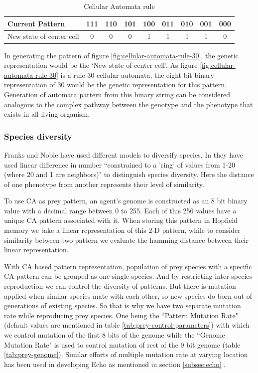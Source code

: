 \documentclass[letterpaper]{article}
\numberwithin{equation}{section}
\begin{document}
\begin{table}[H]
	\centering
	\begin{tabular}{| l | c | c | c | c | c | c | c | c |}
	  \hline
	  Current Pattern & 111 & 110 & 101 & 100 & 011 & 010 & 001 & 000 \\ \hline
	  New state of center cell & 0 & 0 & 0 & 1 & 1 & 1 & 1 & 0 \\
	  \hline
	\end{tabular}
	\caption{Cellular Automata rule}
	\label{tab:cellular-automata-rule}
\end{table}

In generating the pattern of figure \ref{fig:cellular-automata-rule-30}, the genetic representation would be the `New state of center cell'. As figure \ref{fig:cellular-automata-rule-30} is a rule 30 cellular automata, the eight bit binary representation of 30 would be the genetic representation for this pattern. Generation of automata pattern from this binary string can be considered analogous to the complex pathway between the genotype and the phenotype that exists in all living organism.

\subsubsection{Species diversity}
\label{subsec:species-diversity}
Franks and Noble have used different models to diversify species. In \cite{franks2002} they have used linear difference in number ``constrained to a 'ring' of values  from 1-20 (where 20 and 1 are neighbors)" to distinguish species diversity. Here the distance of one phenotype from another represents their level of similarity. 

To use CA as prey pattern, an agent's genome is constructed as an 8 bit binary value with a decimal range between 0 to 255. Each of this 256 values have a unique CA pattern associated with it. When storing this pattern in Hopfield memory we take a linear representation of this 2-D pattern, while to consider similarity between two pattern we evaluate the hamming distance between their linear representation. 

With CA based pattern representation, population of prey species with a specific CA pattern can be grouped as one single species. And by restricting inter species reproduction we can control the diversity of patterns. But there is mutation applied when similar species mate with each other, so new species do born out of generations of existing species. So that is why we have two separate mutation rate while reproducing prey species. One being the ``Pattern Mutation Rate" (default values are mentioned in table \ref{tab:prey-control-parameters}) with which we control mutation of the first 8 bits of the genome while the ``Genome Mutation Rate" is used to control mutation of rest of the 9 bit genome (table \ref{tab:prey-genome}). Similar efforts of multiple mutation rate at varying location has been used in developing Echo as mentioned in section \ref{subsec:echo} \cite{hraber1997}.
\end{document}
